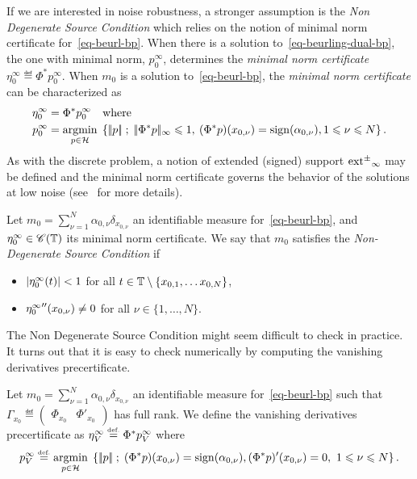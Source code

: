 If we are interested in noise robustness, a stronger assumption is the \textit{Non Degenerate Source Condition} which relies on the notion of minimal norm certificate for~\eqref{eq-beurl-bp}. When there is a solution to~\eqref{eq-beurling-dual-bp}, the one with minimal norm, $p_0^\infty$, determines the \textit{minimal norm certificate} $\eta_0^\infty\eqdef \Phi^*p_0^\infty$. When $m_0$ is a solution to~\eqref{eq-beurl-bp}, the \textit{minimal norm certificate} can be characterized as 
\begin{align}
  {\eta_0^{\infty}}&=\Phi^*{p_0^{\infty}} \quad \text{where} \quad \label{eq-certbeurl0}\\
  {p_0^{\infty}} &= \underset{p\in \mathcal{H}}{\operatorname{argmin}}\; \left\{ |\!| p |\!| \;;\;  |\!| \Phi^* p |\!|_{\infty} \leqslant 1, \: (\Phi^* p)(x_{0,\nu}) = \operatorname{sign}(\alpha_{0,\nu}), 1\leqslant \nu\leqslant N \right\}.
\end{align}
 As with the discrete \lasso problem, a notion of extended (signed) support $\operatorname{ext^{\pm}}_\infty$ may be defined and the minimal norm certificate governs the behavior of the solutions at low noise (see~\cite{2013-duval-sparsespikes} for more details).

 \begin{defn}\label{defn-ndsc-bp}
   Let $m_0=\sum_{\nu=1}^N\alpha_{0,\nu} \delta_{x_{0,\nu}}$ an identifiable measure for~\eqref{eq-beurl-bp}, and ${\eta_0^{\infty}}\in \mathscr{C}(\mathbb{T})$ its minimal norm certificate. We say that $m_0$ satisfies the \textit{Non-Degenerate Source Condition} if
\begin{itemize}
  \item $|{\eta_0^{\infty}}(t)|<1$ for all $t\in \mathbb{T}\setminus \{x_{0,1},\ldots x_{0,N} \}$,
  \item ${\eta_0^{\infty}}''(x_{0,\nu})\neq 0$ for all $\nu\in\{1,\ldots,N\}$.
\end{itemize}
 \end{defn}

The Non Degenerate Source Condition might seem difficult to check in practice. It turns out that it is easy to check numerically by computing the vanishing derivatives precertificate.

\begin{defn}\label{defn-vanishing-bp}
  Let $m_0=\sum_{\nu=1}^N\alpha_{0,\nu} \delta_{x_{0,\nu}}$ an identifiable measure for~\eqref{eq-beurl-bp} such that $\Gamma_{x_0}\eqdef \begin{pmatrix} \Phi_{x_0} & \Phi'_{x_0}\end{pmatrix}$ has full rank. We define the vanishing derivatives precertificate as ${\eta^{\infty}_V} \stackrel{\mbox{\upshape\tiny def.}}{=} \Phi^*{p^{\infty}_V}$ where 
\begin{align}
  {p^{\infty}_V} \stackrel{\mbox{\upshape\tiny def.}}{=} \underset{p\in \mathcal{H}}{\operatorname{argmin}}\; \left\{ |\!| p |\!| \;;\; (\Phi^* p)(x_{0,\nu}) = \operatorname{sign}(\alpha_{0,\nu}), (\Phi^* p)'(x_{0,\nu})=0, \ 1\leqslant \nu\leqslant N \right\}.
  \label{eq-vanishing-p}
\end{align}
\end{defn}

